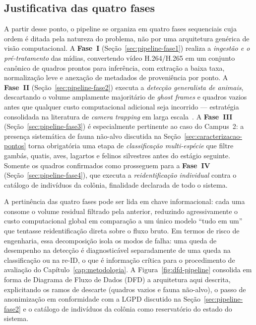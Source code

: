 \subsection*{Justificativa das quatro fases}

A partir desse ponto, o pipeline se organiza em quatro fases sequenciais cuja ordem é ditada pela natureza do problema, não por uma arquitetura genérica de visão computacional. A \textbf{Fase~I} (Seção~\ref{sec:pipeline-fase1}) realiza a \emph{ingestão e o pré-tratamento} das mídias, convertendo vídeo H.264/H.265 em um conjunto canônico de quadros prontos para inferência, com extração a baixa taxa, normalização leve e anexação de metadados de proveniência por ponto. A \textbf{Fase~II} (Seção~\ref{sec:pipeline-fase2}) executa a \emph{detecção generalista de animais}, descartando o volume amplamente majoritário de \emph{ghost frames} e quadros vazios antes que qualquer custo computacional adicional seja incorrido --- estratégia consolidada na literatura de \emph{camera trapping} em larga escala~\cite{bruce2025largescale,velasco2024smartcameratraps,mulero2025addressing}. A \textbf{Fase~III} (Seção~\ref{sec:pipeline-fase3}) é especialmente pertinente ao caso do Campus~2: a presença sistemática de fauna não-alvo discutida na Seção~\ref{sec:caracterizacao-pontos} torna obrigatória uma etapa de \emph{classificação multi-espécie} que filtre gambás, quatis, aves, lagartos e felinos silvestres antes do estágio seguinte. Somente os quadros confirmados como  prosseguem para a \textbf{Fase~IV} (Seção~\ref{sec:pipeline-fase4}), que executa a \emph{reidentificação individual} contra o catálogo de indivíduos da colônia, finalidade declarada de todo o sistema.

A pertinência das quatro fases pode ser lida em chave informacional: cada uma consome o volume residual filtrado pela anterior, reduzindo agressivamente o custo computacional global em comparação a um único modelo ``tudo em um'' que tentasse reidentificação direta sobre o fluxo bruto. Em termos de risco de engenharia, essa decomposição isola os modos de falha: uma queda de desempenho na detecção é diagnosticável separadamente de uma queda na classificação ou na re-ID, o que é informação crítica para o procedimento de avaliação do Capítulo~\ref{cap:metodologia}. A Figura~\ref{fig:dfd-pipeline} consolida em forma de Diagrama de Fluxo de Dados (DFD) a arquitetura aqui descrita, explicitando os ramos de descarte (quadros vazios e fauna não-alvo), o passo de anonimização em conformidade com a LGPD discutido na Seção~\ref{sec:pipeline-fase2} e o catálogo de indivíduos da colônia como reservatório do estado do sistema.

